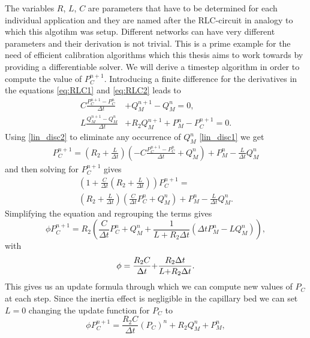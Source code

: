 \documentclass[a4paper, oneside]{discothesis}
\begin{document}
The variables $R$, $L$, $C$ are parameters that have to be determined for each individual application and they are named after the RLC-circuit in analogy to which this algotihm was setup.
Different networks can have very different parameters and their derivation is not trivial.
This is a prime example for the need of efficient calibration algorithms which this thesis aims to work towards by providing a differentiable solver.
We will derive a timestep algorithm in order to compute the value of $P_C^{n+1}$.
Introducing a finite difference for the derivatives in the equations \autoref{eq:RLC1} and \autoref{eq:RLC2} leads to
\begin{align}
	C{\frac{P_C^{n+1}-P_C^{n}}{\Delta t}} &+ Q_M^{n+1}-Q_M^n = 0, \label{lin_disc1}\\ 
	L\frac{Q_M^{n+1}-Q_M^{n}}{\Delta t} &+ R_{2}Q_M^{n+1}+P_M^n-P_C^{n+1} = 0. \label{lin_disc2}
\end{align}
Using \ref{lin_disc2} to eliminate any occurrence of $Q_M^n$ \ref{lin_disc1} we get
\begin{align}
	P_C^{n+1} = \left(R_2 + \frac{L}{\Delta t}\right) \left( - C \frac{P_C^{n+1} - P_C^{n}}{\Delta t} + Q_M^n\right)+ P_M^n - \frac{L}{\Delta t} Q_M^{n}
\end{align}
and then solving for $P_C^{n+1}$ gives
\begin{multline}
	\left( 1+ \frac{C}{\Delta t}\left( R_2 + \frac{L}{\Delta t} \right) \right) P_C^{n+1} = \\
	\left( R_2 + \frac{L}{\Delta t} \right) \left( \frac{C}{\Delta t} P_C^n + Q_M^n \right) + P_M^n - \frac{L}{\Delta t} Q_M^n.
\end{multline}
Simplifying the equation and regrouping the terms gives
\begin{equation}
	\phi P_{C}^{n+1}=R_2 \left( \frac{C}{\Delta t}P_C^{n} + Q_M^n+\frac{1}{L+R_{2}\Delta t}\left(\Delta t P_M^n-L Q_M^{n}\right) \right),
\end{equation}
with 
\begin{equation}
	\phi=\frac{R_{2}C}{\Delta t}{\bf+}\frac{R_{2}\Delta t}{L{+}R_{2}\Delta t}. \label{RCL}
\end{equation}
This gives us an update formula through which we can compute new values of $P_C$ at each step.
Since the inertia effect is negligible in the capillary bed we can set $L=0$ changing the update function for $P_C$ to 
\begin{equation}
	\phi P_{C}^{n+1}=\frac{R_{2}C}{\Delta t}(P_{C})^{n}+R_{2} Q_M^n+P_M^n,
\end{equation}
\end{document}
